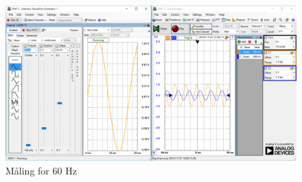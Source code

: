 \begin{figure}[H]
	\centering
	\includegraphics[width=1.0\textwidth]{Figurer/60Hz}
	\caption{Måling for 60 Hz}
	\label{fig:maeling60Hz}
\end{figure}

